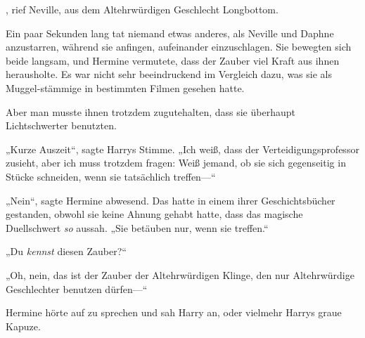, rief Neville, aus dem Altehrwürdigen Geschlecht Longbottom.  

\later

Ein paar Sekunden lang tat niemand etwas anderes, als Neville und Daphne anzustarren, während sie anfingen, aufeinander einzuschlagen. Sie bewegten sich beide langsam, und Hermine vermutete, dass der Zauber viel Kraft aus ihnen herausholte. Es war nicht sehr beeindruckend im Vergleich dazu, was sie als Muggel-stämmige in bestimmten Filmen gesehen hatte.

Aber man musste ihnen trotzdem zugutehalten, dass sie überhaupt Lichtschwerter benutzten.

„Kurze Auszeit“, sagte Harrys Stimme. „Ich weiß, dass der Verteidigungsprofessor zusieht, aber ich muss trotzdem fragen: Weiß jemand, ob sie sich gegenseitig in Stücke schneiden, wenn sie tatsächlich treffen—“

„Nein“, sagte Hermine abwesend. Das hatte in einem ihrer Geschichtsbücher gestanden, obwohl sie keine Ahnung gehabt hatte, dass das magische Duellschwert \emph{so} aussah. „Sie betäuben nur, wenn sie treffen.“

„Du \emph{kennst} diesen Zauber?“

„Oh, nein, das ist der Zauber der Altehrwürdigen Klinge, den nur Altehrwürdige Geschlechter benutzen dürfen—“

Hermine hörte auf zu sprechen und sah Harry an, oder vielmehr Harrys graue Kapuze.

